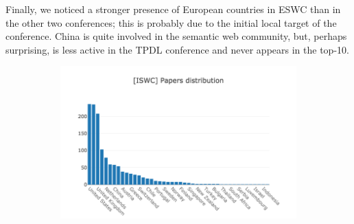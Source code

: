 \documentclass{llncs}
\begin{document}
Finally, we noticed a stronger presence of European countries in ESWC than in the other two conferences; this is probably due to the initial local target of the conference.
China is quite involved in the semantic web community, but, perhaps surprising, is less active in the TPDL conference and never appears in the top-10.
%
\begin{figure}[t]
\begin{subfigure}{.5\textwidth}
	\centering
    \includegraphics[width=\textwidth]{images/iswc_dois_longtail.png}
	\caption[ ]{}
	\label{fig:iswc_dois_longtail}
\end{subfigure}%
\begin{subfigure}{.5\textwidth}
	\centering

\end{subfigure}
\end{figure}
\end{document}
